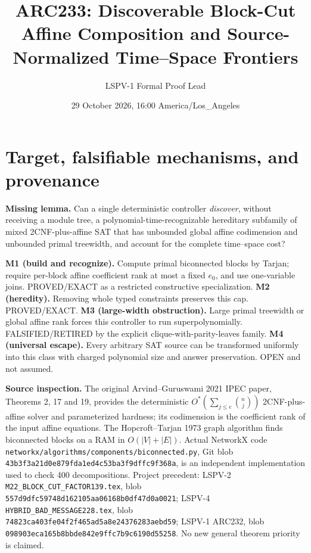 \documentclass[10pt]{article}
\title{ARC233: Discoverable Block-Cut Affine Composition and Source-Normalized Time--Space Frontiers}
\author{LSPV-1 Formal Proof Lead}
\date{29 October 2026, 16:00 America/Los\_Angeles}
\begin{document}
\maketitle
\begin{center}
\end{center}

\section{Target, falsifiable mechanisms, and provenance}
\noindent\textbf{Missing lemma.} Can a single deterministic controller \emph{discover}, without receiving a module tree, a polynomial-time-recognizable hereditary subfamily of mixed 2CNF-plus-affine SAT that has unbounded global affine codimension and unbounded primal treewidth, and account for the complete time--space cost?

\noindent\textbf{M1 (build and recognize).} Compute primal biconnected blocks by Tarjan; require per-block affine coefficient rank at most a fixed $e_0$, and use one-variable joins. PROVED/EXACT as a restricted constructive specialization. \textbf{M2 (heredity).} Removing whole typed constraints preserves this cap. PROVED/EXACT. \textbf{M3 (large-width obstruction).} Large primal treewidth or global affine rank forces this controller to run superpolynomially. FALSIFIED/RETIRED by the explicit clique-with-parity-leaves family. \textbf{M4 (universal escape).} Every arbitrary SAT source can be transformed uniformly into this class with charged polynomial size and answer preservation. OPEN and not assumed.

\noindent\textbf{Source inspection.} The original Arvind--Guruswami 2021 IPEC paper, Theorems 2, 17 and 19, provides the deterministic $O^*(\sum_{j\le e}\binom nj)$ 2CNF-plus-affine solver and parameterized hardness; its codimension is the coefficient rank of the input affine equations. The Hopcroft--Tarjan 1973 graph algorithm finds biconnected blocks on a RAM in $O(|V|+|E|)$. Actual NetworkX code \texttt{networkx/algorithms/components/biconnected.py}, Git blob \texttt{43b3f3a21d0e879fda1ed4c53ba3f9dffc9f368a}, is an independent implementation used to check 400 decompositions. Project precedent: LSPV-2 \texttt{M22\_BLOCK\_CUT\_FACTOR139.tex}, blob \texttt{557d9dfc59748d162105aa06168b0df47d0a0021}; LSPV-4 \texttt{HYBRID\_BAD\_MESSAGE228.tex}, blob \texttt{74823ca403fe04f2f465ad5a8e24376283aebd59}; LSPV-1 ARC232, blob \texttt{098903eca165b8bbde842e9ffc7b9c6190d55258}. No new general theorem priority is claimed.
\end{document}
